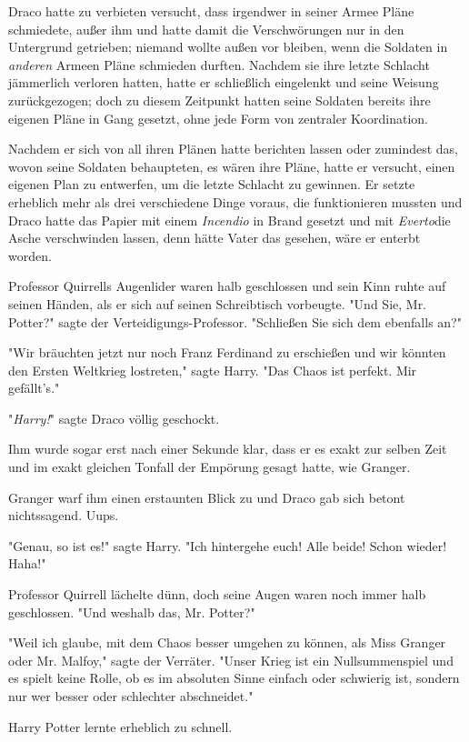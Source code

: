 {Draco hatte zu verbieten versucht, dass irgendwer in seiner Armee Pläne schmiedete, außer ihm und hatte damit die Verschwörungen nur in den Untergrund getrieben; niemand wollte außen vor bleiben, wenn die Soldaten in \emph{anderen} Armeen Pläne schmieden durften. Nachdem sie ihre letzte Schlacht jämmerlich verloren hatten, hatte er schließlich eingelenkt und seine Weisung zurückgezogen; doch zu diesem Zeitpunkt hatten seine Soldaten bereits ihre eigenen Pläne in Gang gesetzt, ohne jede Form von zentraler Koordination.

Nachdem er sich von all ihren Plänen hatte berichten lassen oder zumindest das, wovon seine Soldaten behaupteten, es wären ihre Pläne, hatte er versucht, einen eigenen Plan zu entwerfen, um die letzte Schlacht zu gewinnen. Er setzte erheblich mehr als drei verschiedene Dinge voraus, die funktionieren mussten und Draco hatte das Papier mit einem \emph{Incendio} in Brand gesetzt und mit \emph{Everto}die Asche verschwinden lassen, denn hätte Vater das gesehen, wäre er enterbt worden.

Professor Quirrells Augenlider waren halb geschlossen und sein Kinn ruhte auf seinen Händen, als er sich auf seinen Schreibtisch vorbeugte. "Und Sie, Mr. Potter?" sagte der Verteidigungs-Professor. "Schließen Sie sich dem ebenfalls an?"

"Wir bräuchten jetzt nur noch Franz Ferdinand zu erschießen und wir könnten den Ersten Weltkrieg lostreten," sagte Harry. "Das Chaos ist perfekt. Mir gefällt's."

"\emph{Harry!}" sagte Draco völlig geschockt.

Ihm wurde sogar erst nach einer Sekunde klar, dass er es exakt zur selben Zeit und im exakt gleichen Tonfall der Empörung gesagt hatte, wie Granger.

Granger warf ihm einen erstaunten Blick zu und Draco gab sich betont nichtssagend. Uups.

"Genau, so ist es!" sagte Harry. "Ich hintergehe euch! Alle beide! Schon wieder! Haha!"

Professor Quirrell lächelte dünn, doch seine Augen waren noch immer halb geschlossen. "Und weshalb das, Mr. Potter?"

"Weil ich glaube, mit dem Chaos besser umgehen zu können, als Miss Granger oder Mr. Malfoy," sagte der Verräter. "Unser Krieg ist ein Nullsummenspiel und es spielt keine Rolle, ob es im absoluten Sinne einfach oder schwierig ist, sondern nur wer besser oder schlechter abschneidet."

Harry Potter lernte erheblich zu schnell.

}
